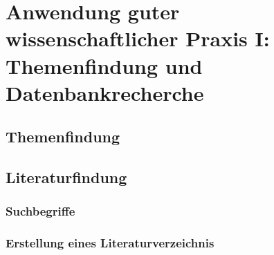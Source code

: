 \section{Anwendung guter wissenschaftlicher Praxis I: Themenfindung und Datenbankrecherche}

\subsection{Themenfindung}

\subsection{Literaturfindung}

\subsubsection{Suchbegriffe}
\lipsum[1-2]

\subsubsection{Erstellung eines Literaturverzeichnis}
\lipsum[1-2]